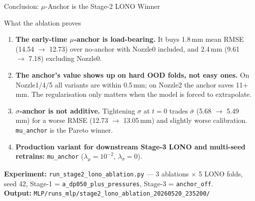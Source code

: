\documentclass[UTF8,aspectratio=169]{ctexbeamer}
\begin{document}
\begin{frame}{Conclusion: $\mu$-Anchor is the Stage-2 LONO Winner}
\small
\begin{block}{What the ablation proves}
\begin{enumerate}
  \item \textbf{The early-time $\mu$-anchor is load-bearing.} It buys 1.8\,mm mean RMSE
        (14.54 $\to$ 12.73) over no-anchor with Nozzle0 included, and 2.4\,mm
        (9.61 $\to$ 7.18) excluding Nozzle0.
  \item \textbf{The anchor's value shows up on hard OOD folds, not easy ones.} On Nozzle1/4/5
        all variants are within 0.5\,mm; on Nozzle2 the anchor saves 11+\,mm. The
        regularisation only matters when the model is forced to extrapolate.
  \item \textbf{$\sigma$-anchor is not additive.} Tightening $\sigma$ at $t{=}0$ trades
        $\bar\sigma$ (5.68 $\to$ 5.49\,mm) for a worse RMSE (12.73 $\to$ 13.05\,mm) and
        slightly worse calibration. \texttt{mu\_anchor} is the Pareto winner.
  \item \textbf{Production variant for downstream Stage-3 LONO and multi-seed retrains:}
        \texttt{mu\_anchor} ($\lambda_\mu{=}10^{-2}$, $\lambda_\sigma{=}0$).
\end{enumerate}
\end{block}

\vspace{0.3em}
\textbf{Experiment:} \texttt{run\_stage2\_lono\_ablation.py} --- 3 ablations $\times$ 5 LONO
folds, seed 42, Stage-1 = \texttt{a\_dp050\_plus\_pressures}, Stage-3 = \texttt{anchor\_off}.\\
\textbf{Output:} \texttt{MLP/runs\_mlp/stage2\_lono\_ablation\_20260520\_235200/}
\end{frame}
\end{document}
